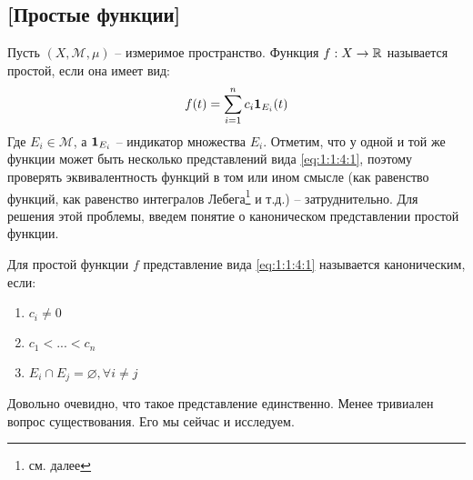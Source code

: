 \documentclass[../main.tex]{subfiles}
\begin{document}
\subsection{[Простые функции]}

Пусть $(X, \mathcal{M}, \mu)$ -- измеримое пространство. Функция $f : X \to \mathbb{R}$ называется простой, если она имеет вид:
\begin{equation}\label{eq:1:1:4:1}
	f(t) = \sum_{i=1}^{n}{c_i \mathbf{1}_{E_i} (t)}
\end{equation}
Где $E_i \in \mathcal{M}$, а $\mathbf{1}_{E_i}$ -- индикатор множества $E_i$. Отметим, что у одной и той же функции может быть несколько представлений вида \eqref{eq:1:1:4:1}, поэтому проверять эквивалентность функций в том или ином смысле (как равенство функций, как равенство интегралов Лебега\footnote{см. далее} и т.д.) -- затруднительно. Для решения этой проблемы, введем понятие о каноническом представлении простой функции. 

\begin{definition}
	Для простой функции $f$ представление вида \eqref{eq:1:1:4:1} называется каноническим, если:
	\begin{enumerate}
		\item $c_i \neq 0$
		\item $c_1 < ... < c_n$
		\item $E_i \cap E_j = \varnothing, \forall i \neq j$
	\end{enumerate}
\end{definition}

Довольно очевидно, что такое представление единственно. Менее тривиален вопрос существования. Его мы сейчас и исследуем. 
\end{document}
